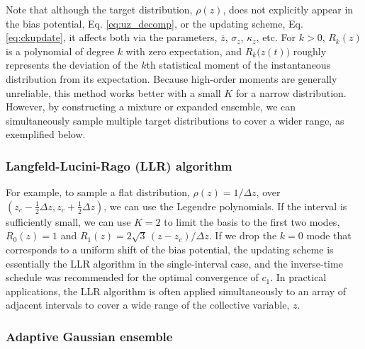 \documentclass[reprint, superscriptaddress, floatfix]{revtex4-1}
\begin{document}
Note that although the target distribution, $\rho(z)$,
does not explicitly appear in the bias potential, Eq. \eqref{eq:uz_decomp},
or the updating scheme, Eq. \eqref{eq:ckupdate},
it affects both via the parameters,
$\overline z$,
$\sigma_z$,
$\kappa_z$, etc.
%
For $k > 0$, $R_k(z)$ is a polynomial of degree $k$ with zero expectation,
%
and $R_k\bigl(z(t)\bigr)$ roughly
represents the deviation of the $k$th statistical moment
of the instantaneous distribution
from its expectation.
Because high-order moments are generally unreliable,
this method works better with a small $K$ for a narrow distribution.
%
However, by constructing
a mixture or expanded ensemble\cite{swendsen1986,
  *geyer1991, *hukushima1996, *hansmann1997, *sugita1999,
  *earl2005, *zuckerman2011, *rauscher2009,
  neuhaus2006, *neuhaus2007, kim2010,
  marinari1992,
  *lyubartsev1992, li2007,
  park2007, *nguyen2013, *zhang2015st, shirts2017},
we can simultaneously sample multiple target distributions
to cover a wider range, as exemplified below.


\subsubsection{Langfeld-Lucini-Rago (LLR) algorithm}

For example,
to sample a flat distribution, $\rho(z) = 1/\Delta z$,
over $\left(z_c - \frac 1 2 \Delta z, z_c + \frac 1 2 \Delta z\right)$,
we can use the Legendre polynomials\cite{arfken}.
%
If the interval is sufficiently small,
we can use $K = 2$ to limit the basis to the first two modes,
$R_0(z) = 1$ and $R_1(z) = 2 \sqrt{3} \, (z - z_c)/\Delta z$.
%
If we drop the $k = 0$ mode
that corresponds to a uniform shift of the bias potential,
the updating scheme is essentially the LLR algorithm\cite{langfeld2012}
in the single-interval case,
and the inverse-time schedule
was recommended for the optimal convergence of $c_1$.\cite{pellegrini2014}
%
In practical applications,
the LLR algorithm is often applied simultaneously
to an array of adjacent intervals
to cover a wide range of the collective variable, $z$.\cite{langfeld2012, pellegrini2014}
%



\subsubsection{\label{sec:age}
Adaptive Gaussian ensemble}
\end{document}
